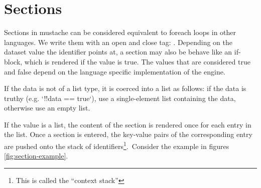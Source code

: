 \documentclass[thesis.tex]{subfiles}
\begin{document}
\section{Sections}
\label{sec:mustache-explain-section}
Sections in mustache can be considered equivalent to foreach loops in other
languages. We write them with an open and close tag:
.
Depending on the dataset value the identifier points at, a section may also be
behave like an if-block, which is rendered if the value is true. The values that
are considered true and false depend on the language specific implementation
of the engine.
\begin{citequote}{\cite[sections.yml]{MSTSPEC}}
	If the data is not of a list type, it is coerced into a list as follows: if
	the data is truthy (e.g. `!!data == true`), use a single-element list
	containing the data, otherwise use an empty list.
\end{citequote}
If the value is a list, the content of the section is rendered once for each
entry in the list. Once a section is entered, the key-value pairs of the
corresponding entry are pushed onto the stack of identifiers\footnote{
	This is called the ``context stack''
}.\
Consider the example in figures \ref{fig:section-example}.
\end{document}
